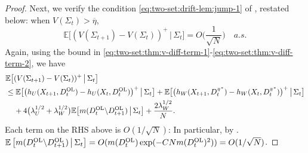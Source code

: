 \documentclass[11pt,letterpaper]{article}
\theoremstyle{plain}
\theoremstyle{definition}
\theoremstyle{remark}
\newcommand{\E}[1]{\mathbb{E}\left[#1\right]}
\newcommand{\Ebig}[1]{\mathbb{E}\big[#1\big]}
\newcommand{\givenbig}{\,\big|\,}
\newcommand{\pibar}{{\sysbar{\pi}}}
\newcommand{\pibs}{{\pibar^*}}
\newcommand{\sysbar}[1]{\bar{#1}}
\newcommand{\threshbar}{\overline{\eta}}
\newcommand{\wmat}{W}
\newcommand{\umat}{U}
\newcommand{\hw}{h_\wmat}
\newcommand{\hu}{h_\umat}
\newcommand{\lamw}{\lambda_\wmat}
\newcommand{\lamu}{\lambda_\umat}
\newcommand{\Da}{D^{\pibs}}
\newcommand{\Db}{D^{\textup{OL}}}
\newcommand{\Fullstate}{\Sigma}
\begin{document}
\begin{proof}
Next, we verify the condition \eqref{eq:two-set:drift-lem:jump-1} of , restated below: when $V(\Fullstate_t) > \threshbar$, 
\begin{equation}
     \Ebig{(V(\Fullstate_{t+1}) - V(\Fullstate_t))^+  \givenbig \Fullstate_t} = O\Big(\frac{1}{\sqrt{N}}\Big) \quad a.s.
\end{equation}
Again, using the bound in \eqref{eq:two-set:thm:v-diff-term-1}-\eqref{eq:two-set:thm:v-diff-term-2}, we have
\begin{align}
    \nonumber
    & \Ebig{(V(\Fullstate_{t+1}) - V(\Fullstate_t))^+ \givenbig \Fullstate_t}\\
    \nonumber
    &\leq \Ebig{\big(\hu(X_{t+1}, \Db_t) - \hu(X_{t}, \Db_t)\big)^+ \givenbig \Fullstate_t} + \Ebig{\big(\hw(X_{t+1}, \Da_t) - \hw(X_{t}, \Da_t)\big)^+ \givenbig \Fullstate_t} \\
    \nonumber
    &\mspace{20mu} + 4\big(\lamu^{1/2} + \lamw^{1/2}\big) \Ebig{m(\Db_t \backslash \Db_{t+1})\givenbig \Fullstate_t} + \frac{2\lamw^{1/2}}{N}. 
\end{align}
Each term on the RHS above is $O(1/\sqrt{N})$: In particular, by . $\E{m(\Db_t \backslash \Db_{t+1}) \givenbig \Fullstate_t} = O(m(\Db_{t})\exp(-CN m(\Db_{t})^2)) = O(1/\sqrt{N})$. 


\end{proof}
\end{document}
